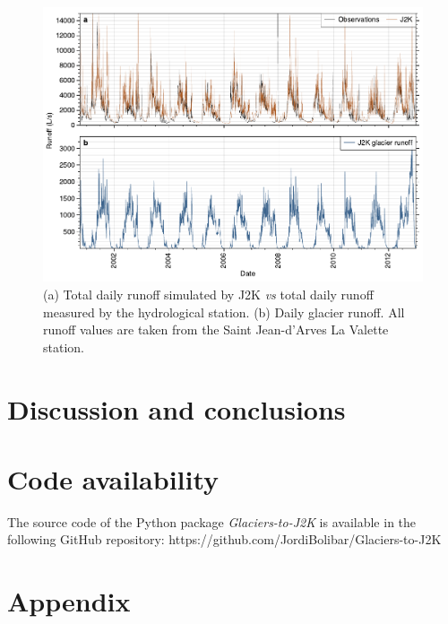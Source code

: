 \begin{figure}[h]
\centering
\includegraphics[width=15cm]{Figures/hydro/Figure_5.pdf}
\caption{(a) Total daily runoff simulated by J2K \textit{vs} total daily runoff measured by the hydrological station. (b) Daily glacier runoff. All runoff values are taken from the Saint Jean-d'Arves La Valette station.} 
\label{hydro:fig5}
\end{figure}

\section{Discussion and conclusions}

\section{Code availability}

The source code of the Python package \textit{Glaciers-to-J2K} is available in the following GitHub repository: https://github.com/JordiBolibar/Glaciers-to-J2K

\section{Appendix}

